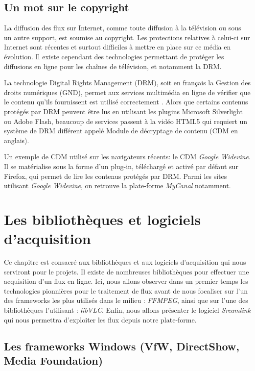 \documentclass{polytech/polytech}
\begin{document}
\section{Un mot sur le copyright}


La diffusion des flux sur Internet, comme toute diffusion à la télévision ou sous un autre support, est soumise au copyright. Les protections relatives à celui-ci sur Internet sont récentes et surtout difficiles à mettre en place sur ce média en évolution. Il existe cependant des technologies permettant de protéger les diffusions en ligne pour les chaînes de télévision, et notamment la DRM.

La technologie Digital Rights Management (DRM), soit en français la Gestion des droits numériques (GND), permet aux services multimédia en ligne de vérifier que le contenu qu'ils fournissent est utilisé correctement \cite{_lire_2018}. Alors que certains contenus protégés par DRM peuvent être lus en utilisant les plugins Microsoft Silverlight ou Adobe Flash, beaucoup de services passent à la vidéo HTML5 qui requiert un système de DRM différent appelé Module de décryptage de contenu (CDM en anglais).

Un exemple de CDM utilisé sur les navigateurs récents: le CDM \textit{Google Widevine}. Il se matérialise sous la forme d'un plug-in, téléchargé et activé par défaut sur Firefox, qui permet de lire les contenus protégés par DRM. Parmi les sites utilisant \textit{Google Widevine}, on retrouve la plate-forme \textit{MyCanal} notamment.


\chapter{Les bibliothèques et logiciels d'acquisition}


Ce chapitre est consacré aux bibliothèques et aux logiciels d'acquisition qui nous serviront pour le projets. Il existe de nombreuses bibliothèques pour effectuer une acquisition d'un flux en ligne. Ici, nous allons observer dans un premier temps les technologies pionnières pour le traitement de flux avant de nous focaliser sur l'un des frameworks les plus utilisés dans le milieu : \textit{FFMPEG}, ainsi que sur l'une des bibliothèques l'utilisant : \textit{libVLC}. Enfin, nous allons présenter le logiciel \textit{Sreamlink} qui nous permettra d'exploiter les flux depuis notre plate-forme.


\section{Les frameworks Windows (VfW, DirectShow, Media Foundation)}
\end{document}
